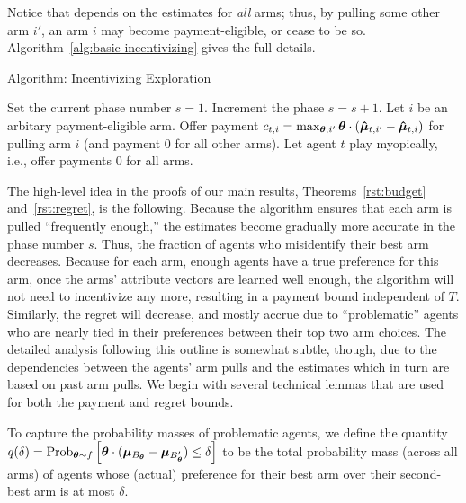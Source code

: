 Notice that  depends on the estimates for \emph{all}
arms; thus, by pulling some other arm $i'$, an arm $i$ may become
payment-eligible, or cease to be so.
Algorithm~\ref{alg:basic-incentivizing} gives the full details.


\begin{algorithm}
\caption{Algorithm: Incentivizing Exploration \label{alg:basic-incentivizing}}
\begin{algorithmic}
\STATE Set the current phase number $s = 1$.
\STATE Increment the phase $s = s + 1$.
\ENDIF
{}
\STATE Let $i$ be an arbitary payment-eligible arm.
\STATE Offer payment
$c_{t,i} = \max_{\bm{\theta},i'} \bm{\theta} \cdot (\bm{\hat{\mu}}_{t,i'} - \bm{\hat{\mu}}_{t,i})$
for pulling arm $i$
(and payment 0 for all other arms).
\ELSE
\STATE Let agent $t$ play myopically, i.e., offer payments 0 for all arms.
\ENDIF
\ENDFOR
\end{algorithmic}
\end{algorithm}

The high-level idea in the proofs of our main results, Theorems~\ref{rst:budget} and~\ref{rst:regret},
is the following.
Because the algorithm ensures that each arm is pulled
``frequently enough,''
the estimates  become gradually more accurate in the
phase number $s$.
Thus, the fraction of agents who misidentify their best arm decreases.
Because for each arm, enough agents have a true preference for this
arm, once the arms' attribute vectors are learned well enough,
the algorithm will not need to incentivize any more,
resulting in a payment bound independent of $T$.
Similarly, the regret will decrease, and mostly accrue
due to ``problematic'' agents who are nearly tied in their preferences
between their top two arm choices.
The detailed analysis following this outline is somewhat subtle, though,
due to the dependencies between the agents' arm pulls and the
estimates which in turn are based on past arm pulls.
We begin with several technical lemmas that are used for both the
payment and regret bounds.

To capture the probability masses of problematic agents,
we define the quantity
$\AlmostTied{\delta} = \Prob[\AgV \sim \AgentDist]{%
\AgV \cdot (\ArmV{\Best{\AgV}} - \ArmV{\Second{\AgV}}) \leq \delta}$
to be the total probability mass (across all arms) of agents
whose (actual) preference for their best arm over their second-best
arm is at most $\delta$.

